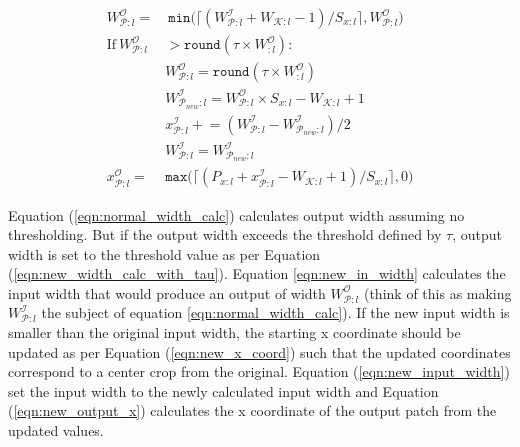 \begin{align}
\label{eqn:normal_width_calc}
W^\mathcal{O}_{\mathcal{P}:l} = &~ \texttt{min}\big(\lceil (W^\mathcal{I}_{\mathcal{P}:l} + W_{\mathcal{K}:l} - 1)/S_{x:l} \rceil, W^\mathcal{O}_{\mathcal{P}:l}\big)\\
\label{eqn:check_tau}
\text{If}~ W_{\mathcal{P}:l}^\mathcal{O} & > \texttt{round}(\tau \times W^\mathcal{O}_{:l}):\\
\label{eqn:new_width_calc_with_tau}
& W^\mathcal{O}_{\mathcal{P}:l} = \texttt{round}(\tau \times W^\mathcal{O}_{:l})\\
\label{eqn:new_in_width}
& W^\mathcal{I}_{\mathcal{P}_{new}:l} = W^\mathcal{O}_{\mathcal{P}:l} \times S_{x:l} - W_{\mathcal{K}:l} + 1\\
\label{eqn:new_x_coord}
& x^{\mathcal{I}}_{\mathcal{P}:l} \mathrel{+}= (W^\mathcal{I}_{\mathcal{P}:l} - W^\mathcal{I}_{\mathcal{P}_{new}:l})/2\\
\label{eqn:new_input_width}
& W^\mathcal{I}_{\mathcal{P}:l} = W^\mathcal{I}_{\mathcal{P}_{new}:l}\\
\label{eqn:new_output_x}
x^\mathcal{O}_{\mathcal{P}:l} = & \texttt{max}\big(\lceil (P_{x:l} + x^\mathcal{I}_{\mathcal{P}:l} - W_{\mathcal{K}:l} + 1)/S_{x:l} \rceil, 0\big)
\end{align}

Equation (\ref{eqn:normal_width_calc}) calculates output width assuming no thresholding.
But if the output width exceeds the threshold defined by $\tau$, output width is set to the threshold value as per Equation (\ref{eqn:new_width_calc_with_tau}).
Equation \ref{eqn:new_in_width} calculates the input width that would produce an output of width $W^\mathcal{O}_{\mathcal{P}:l}$ (think of this as making $W^{\mathcal{I}}_{\mathcal{P}:l}$ the subject of equation \ref{eqn:normal_width_calc}).
If the new input width is smaller than the original input width, the starting x coordinate should be updated as per Equation (\ref{eqn:new_x_coord}) such that the updated coordinates correspond to a center crop from the original.
Equation (\ref{eqn:new_input_width}) set the input width to the newly calculated input width and Equation (\ref{eqn:new_output_x}) calculates the x coordinate of the output patch from the updated values.

